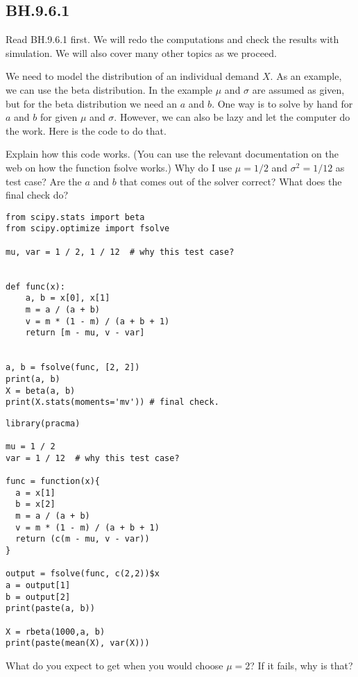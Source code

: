 
\subsection{BH.9.6.1}
\label{sec:bh.9.6.1}

Read BH.9.6.1 first. We will redo the computations and check the results with simulation. We will also cover many other topics as we proceed.



\begin{exercise}
We need to model the distribution of an individual demand $X$.
As an example, we can use the beta distribution. In the example  $\mu$ and $\sigma$ are assumed as given, but for the beta distribution we need an $a$ and $b$. One way is to solve by hand for $a$ and $b$ for given $\mu$ and $\sigma$. However, we can also be lazy and let the computer do the work. Here is the code to do that.

Explain how this code works. (You can use the relevant documentation on the web on how the function fsolve works.) Why do I use $\mu=1/2$ and $\sigma^{2}=1/12$ as test case? Are the $a$ and $b$ that comes out of the solver correct? What does the final check do?
\begin{verbatim}
from scipy.stats import beta
from scipy.optimize import fsolve

mu, var = 1 / 2, 1 / 12  # why this test case?


def func(x):
    a, b = x[0], x[1]
    m = a / (a + b)
    v = m * (1 - m) / (a + b + 1)
    return [m - mu, v - var]


a, b = fsolve(func, [2, 2])
print(a, b)
X = beta(a, b)
print(X.stats(moments='mv')) # final check.
\end{verbatim}

\begin{verbatim}
library(pracma)

mu = 1 / 2 
var = 1 / 12  # why this test case?

func = function(x){
  a = x[1]
  b = x[2]
  m = a / (a + b)
  v = m * (1 - m) / (a + b + 1)
  return (c(m - mu, v - var))
}

output = fsolve(func, c(2,2))$x
a = output[1]
b = output[2]
print(paste(a, b))

X = rbeta(1000,a, b)
print(paste(mean(X), var(X)))
\end{verbatim}

\end{exercise}

\begin{exercise}
What do you expect to get when you would choose $\mu=2$? If it fails, why is that?
\end{exercise}

